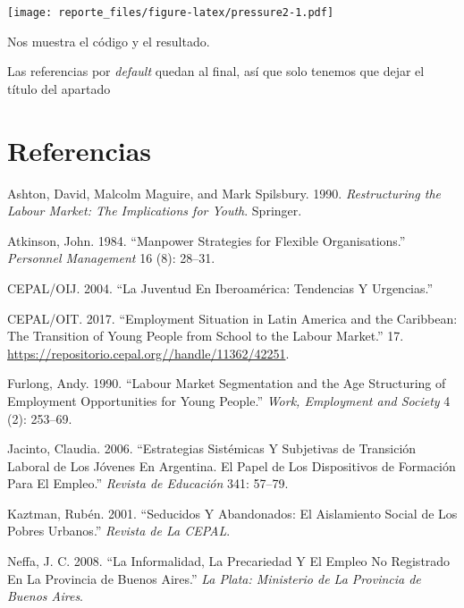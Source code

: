 \documentclass[]{article}
\begin{document}
\texttt{[image: reporte\_files/figure-latex/pressure2-1.pdf]}

Nos muestra el código y el resultado.

Las referencias por \emph{default} quedan al final, así que solo tenemos
que dejar el título del apartado

\hypertarget{referencias}{%
\section*{Referencias}\label{referencias}}

\hypertarget{refs}{}
\leavevmode\hypertarget{ref-ashton_restructuring_1990}{}%
Ashton, David, Malcolm Maguire, and Mark Spilsbury. 1990.
\emph{Restructuring the Labour Market: The Implications for Youth}.
Springer.

\leavevmode\hypertarget{ref-atkinson_manpower_1984}{}%
Atkinson, John. 1984. ``Manpower Strategies for Flexible
Organisations.'' \emph{Personnel Management} 16 (8): 28--31.

\leavevmode\hypertarget{ref-cepaloij_juventud_2004}{}%
CEPAL/OIJ. 2004. ``La Juventud En Iberoamérica: Tendencias Y
Urgencias.''

\leavevmode\hypertarget{ref-cepaloit_employment_2017}{}%
CEPAL/OIT. 2017. ``Employment Situation in Latin America and the
Caribbean: The Transition of Young People from School to the Labour
Market.'' 17. \url{https://repositorio.cepal.org//handle/11362/42251}.

\leavevmode\hypertarget{ref-furlong_labour_1990}{}%
Furlong, Andy. 1990. ``Labour Market Segmentation and the Age
Structuring of Employment Opportunities for Young People.'' \emph{Work,
Employment and Society} 4 (2): 253--69.

\leavevmode\hypertarget{ref-jacinto_estrategias_2006}{}%
Jacinto, Claudia. 2006. ``Estrategias Sistémicas Y Subjetivas de
Transición Laboral de Los Jóvenes En Argentina. El Papel de Los
Dispositivos de Formación Para El Empleo.'' \emph{Revista de Educación}
341: 57--79.

\leavevmode\hypertarget{ref-kaztman_seducidos_2001}{}%
Kaztman, Rubén. 2001. ``Seducidos Y Abandonados: El Aislamiento Social
de Los Pobres Urbanos.'' \emph{Revista de La CEPAL}.

\leavevmode\hypertarget{ref-neffa_informalidad_2008}{}%
Neffa, J. C. 2008. ``La Informalidad, La Precariedad Y El Empleo No
Registrado En La Provincia de Buenos Aires.'' \emph{La Plata: Ministerio
de La Provincia de Buenos Aires}.
\end{document}
